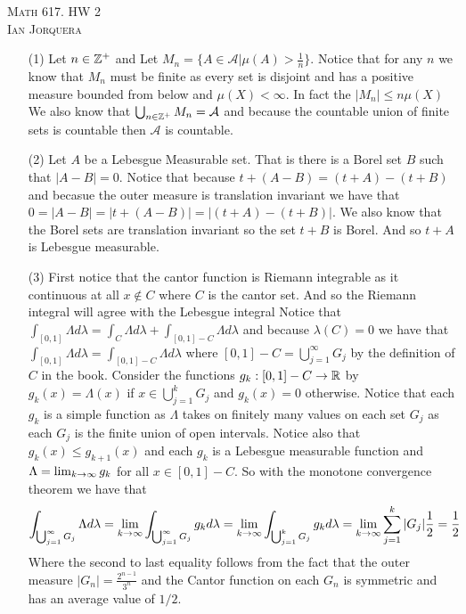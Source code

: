 \documentclass[12pt]{amsart}
\begin{document}
\begin{center}
   \textsc{Math 617. HW 2\\ Ian Jorquera}
\end{center}
\vspace{1em}

\begin{itemize}
   \item[(1)] %
   Let $n\in\mathbb{Z}^+$ and Let $M_n=\{A\in\mathcal A| \mu(A)>\frac{1}{n}\}$. Notice that for any $n$ we know that $M_n$ 
   must be finite as every set is disjoint and has a positive measure bounded from below and $\mu(X)<\infty$. In fact the $|M_n|\leq n\mu(X)$ 
   We also know that $\bigcup_{n\in\mathbb{Z}^+}M_n=\mathcal A$ and because the countable union of finite sets is countable then $\mathcal A$ is countable.


   \item[(2)] Let $A$ be a Lebesgue Measurable set. That is there is a Borel 
   set $B$ such that $|A-B|=0$. Notice that because $t+(A-B)=(t+A)-(t+B)$ and
   becasue the outer measure is translation invariant we have that 
   $0=|A-B|=|t+(A-B)|=|(t+A)-(t+B)|$. We also know that the Borel sets are 
   translation invariant so the set $t+B$ is Borel. And so $t+A$ is Lebesgue measurable.

   
   \item[(3)] First notice that the cantor function is Riemann integrable as 
   it continuous at all $x\not\in C$ where $C$ is the cantor set. And so the 
   Riemann integral will agree with the Lebesgue integral
   Notice that $\int_{[0,1]}\Lambda d\lambda = \int_{C}\Lambda d\lambda+ \int_{[0,1]-C}\Lambda d\lambda$
   and because $\lambda(C)=0$ we have that $\int_{[0,1]}\Lambda d\lambda = \int_{[0,1]-C}\Lambda d\lambda$
   where $[0,1]-C=\bigcup_{j=1}^{\infty}G_j$ by the definition of $C$ in the book.
   Consider the functions $g_k:[0,1]-C\rightarrow \mathbb{R}$ by $g_k(x)=\Lambda(x)$ 
   if $x\in \bigcup_{j=1}^{k}G_j$ and $g_k(x)=0$ otherwise. Notice that each $g_k$ is a 
   simple function as $\Lambda$ takes on finitely many values on each set $G_j$ as each
   $G_j$ is the finite union of open intervals. Notice also that 
   $g_k(x)\leq g_{k+1}(x)$ and each $g_k$ is a Lebesgue measurable function 
   and $\Lambda=\lim_{k\rightarrow \infty}g_k$ for all $x\in [0,1]-C$.
   So with the monotone convergence theorem we have that
   \[\int_{\bigcup_{j=1}^{\infty}G_j}\Lambda d\lambda=
   \lim_{k\rightarrow \infty}\int_{\bigcup_{j=1}^{\infty}G_j}g_kd\lambda=
   \lim_{k\rightarrow \infty}\int_{\bigcup_{j=1}^{k}G_j}g_k d\lambda= 
   \lim_{k\rightarrow \infty}\sum_{j=1}^{k}|G_j|\frac{1}{2}=\frac{1}{2}\]
   Where the second to last equality follows from the fact that the outer measure 
   $|G_n|=\frac{2^{n-1}}{3^n}$ and the Cantor function on each $G_n$ is symmetric 
   and has an average value of $1/2$.



\end{itemize}
\end{document}
